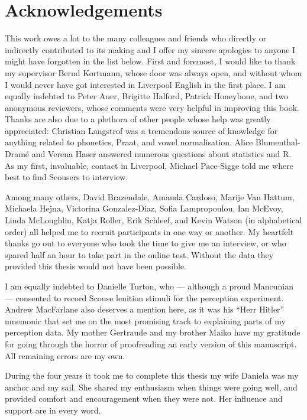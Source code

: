 \chapter*{Acknowledgements}

This work owes a lot to the many colleagues and friends who directly or indirectly contributed to its making and I offer my sincere apologies to anyone I might have forgotten in the list below.
First and foremost, I would like to thank my supervisor Bernd Kortmann, whose door was always open, and without whom I would never have got interested in Liverpool English in the first place.
I am equally indebted to Peter Auer, Brigitte Halford, Patrick Honeybone, and two anonymous reviewers, whose comments were very helpful in improving this book.
Thanks are also due to a plethora of other people whose help was greatly appreciated:
Christian Langstrof was a tremendous source of knowledge for anything related to phonetics, Praat, and vowel normalisation.
Alice Blumenthal-Dramé and Verena Haser answered numerous questions about statistics and R.
As my first, invaluable, contact in Liverpool, Michael Pace-Sigge told me where best to find Scousers to interview.

Among many others, David Brazendale, Amanda Cardoso, Marije Van Hattum, Michaela Hejna, Victorina Gonzalez-Diaz, Sofia Lampropoulou, Ian McEvoy, Linda McLoughlin, Katja Roller, Erik Schleef, and Kevin Watson (in alphabetical order) all helped me to recruit participants in one way or another.
My heartfelt thanks go out to everyone who took the time to give me an interview, or who spared half an hour to take part in the online test.
Without the data they provided this thesis would not have been possible.

I am equally indebted to Danielle Turton, who --- although a proud Mancunian --- consented to record Scouse lenition stimuli for the perception experiment.
Andrew MacFarlane also deserves a mention here, as it was his ``Herr Hitler'' mnemonic that set me on the most promising track to explaining parts of my perception data.
My mother Gertraude and my brother Maiko have my gratitude for going through the horror of proofreading an early version of this manuscript.
All remaining errors are my own.

During the four years it took me to complete this thesis my wife Daniela was my anchor and my sail.
She shared my enthusiasm when things were going well, and provided comfort and encouragement when they were not.
Her influence and support are in every word.